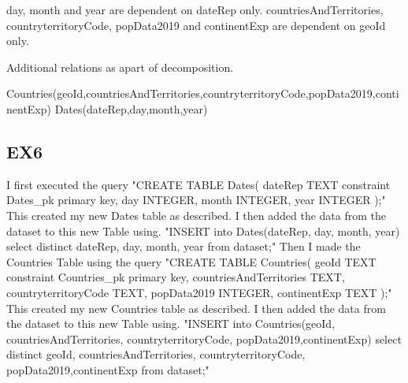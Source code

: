 \documentclass{report}
\begin{document}
	day, month and year are dependent on dateRep only.	
	countriesAndTerritories, countryterritoryCode, popData2019 and continentExp are dependent on geoId only.\newline
	
	Additional relations as apart of decomposition.\newline
	
	Countries(geoId,countriesAndTerritories,countryterritoryCode,popData2019,continentExp)\newline
	Dates(dateRep,day,month,year)\newline
	\subsection{EX6}
	
	
	I first executed the query \newline
	\newline
	"CREATE TABLE Dates(\newline
	dateRep TEXT\newline
	constraint Dates\_pk\newline
	primary key,\newline
	day INTEGER,\newline
	month INTEGER,\newline
	year INTEGER\newline
	);"\newline
	\newline
	This created my new Dates table as described. I then added the data from the dataset to this new Table using.\newline
	\newline
	"INSERT into Dates(dateRep, day, month, year) select distinct dateRep, day, month, year from dataset;"\newline
	\newline
	Then I made the Countries Table using the query\newline\newline
	"CREATE TABLE Countries(\newline
	geoId TEXT\newline
	constraint Countries\_pk\newline
	primary key,\newline
	countriesAndTerritories TEXT,\newline
	countryterritoryCode TEXT,\newline
	popData2019 INTEGER,\newline
	continentExp TEXT\newline
	);"\newline
	\newline
	This created my new Countries table as described. I then added the data from the dataset to this new Table using.\newline
	\newline
	"INSERT into Countries(geoId, countriesAndTerritories, countryterritoryCode, popData2019,continentExp) select distinct geoId, countriesAndTerritories, countryterritoryCode, popData2019,continentExp from dataset;"\newline
	
\end{document}
